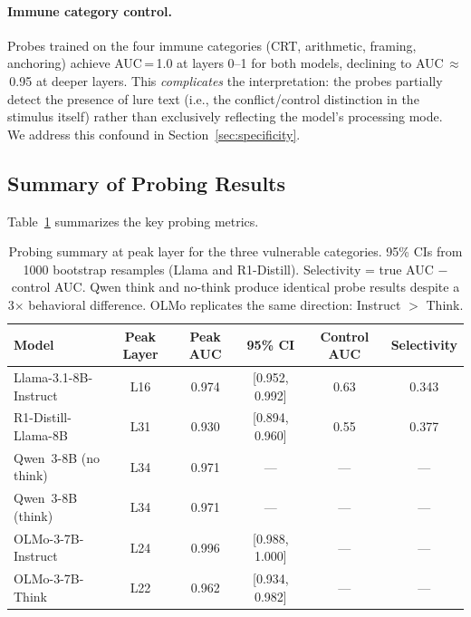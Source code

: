 \documentclass[accepted]{article}
\begin{document}
\paragraph{Immune category control.}  Probes trained on the four immune
categories (CRT, arithmetic, framing, anchoring) achieve
AUC\,=\,1.0 at layers 0--1 for both models, declining to
AUC\,$\approx$\,0.95 at deeper layers.  This \emph{complicates} the
interpretation: the probes partially detect the presence of lure text
(i.e., the conflict/control distinction in the stimulus itself) rather
than exclusively reflecting the model's processing mode.  We address
this confound in Section~\ref{sec:specificity}.

\subsection{Summary of Probing Results}

Table~\ref{tab:probe_summary} summarizes the key probing metrics.

\begin{table}[t]
\centering
\caption{Probing summary at peak layer for the three
  vulnerable categories.  95\% CIs from 1000 bootstrap resamples
  (Llama and R1-Distill).
  Selectivity = true AUC $-$ control AUC.
  Qwen think and no-think produce identical probe results despite
  a 3$\times$ behavioral difference.  OLMo replicates the same
  direction: Instruct $>$ Think.}
\label{tab:probe_summary}
\vspace{4pt}
\small
\begin{tabular}{lccccc}
\toprule
\textbf{Model} & \textbf{Peak Layer} & \textbf{Peak AUC} & \textbf{95\% CI} & \textbf{Control AUC} & \textbf{Selectivity} \\
\midrule
Llama-3.1-8B-Instruct & L16 & 0.974 & [0.952, 0.992] & 0.63 & 0.343 \\
R1-Distill-Llama-8B   & L31 & 0.930 & [0.894, 0.960] & 0.55 & 0.377 \\
Qwen~3-8B (no think)  & L34 & 0.971 & ---             & ---  & --- \\
Qwen~3-8B (think)     & L34 & 0.971 & ---             & ---  & --- \\
\midrule
OLMo-3-7B-Instruct    & L24 & 0.996 & [0.988, 1.000]  & ---  & --- \\
OLMo-3-7B-Think       & L22 & 0.962 & [0.934, 0.982]  & ---  & --- \\
\bottomrule
\end{tabular}
\end{table}
\end{document}
